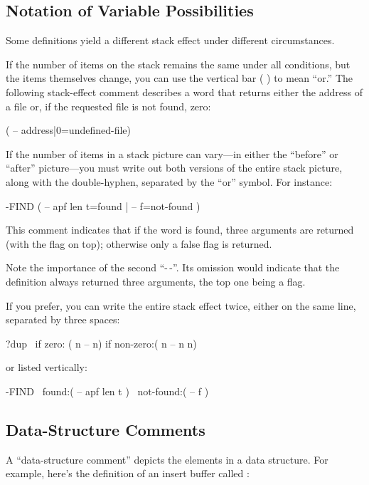 \subsection{Notation of Variable Possibilities}%
Some definitions yield a different stack effect under different
circumstances.

If the number of items on the stack remains the same under all
conditions, but the items themselves change, you can use the vertical
bar ( \forth{|} ) to mean ``or.'' The following stack-effect comment
describes a word that returns either the address of a file or, if the
requested file is not found, zero:
\begin{Code}
( -- address|0=undefined-file)
\end{Code}
If the number of items in a stack picture can vary---in either the
``before'' or ``after'' picture---you must write out both versions of
the entire stack
picture, along with the double-hyphen, separated by the ``or'' symbol.
For instance:
\begin{Code}
-FIND   ( -- apf len t=found | -- f=not-found )
\end{Code}
This comment indicates that if the word is found, three arguments are
returned (with the flag on top); otherwise only a false flag is
returned.

Note the importance of the second ``-\,-''.  Its omission would indicate
that the definition always returned three arguments, the top one being
a flag.

%
If you prefer, you can write the entire stack effect twice, either on
the same line, separated by three spaces:
\begin{Code}
?dup   \ if zero: ( n -- n)    if non-zero:( n -- n n)
\end{Code}
or listed vertically:
\begin{Code}
-FIND  \     found:( -- apf len t )
       \ not-found:( -- f )
\end{Code}
%

\subsection{Data-Structure Comments}%

A ``data-structure comment'' depicts the elements in a data structure.
For example, here's the definition of an insert buffer called
 :

